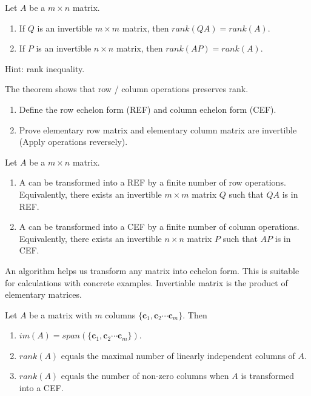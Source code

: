 \documentclass[12pt]{article}
\begin{document}
\begin{theorem}
    Let $A$ be a $m\times n$ matrix.
    \begin{enumerate}
        \item If $Q$ is an invertible $m\times m$ matrix, then $rank(QA)=rank(A)$.
        \item If $P$ is an invertible $n\times n$ matrix, then $rank(AP)=rank(A)$.
    \end{enumerate}
\end{theorem}

\begin{pfbox}
    Hint: rank inequality.
\end{pfbox}

The theorem shows that row / column operations preserves rank.

\begin{exercise}
    \begin{enumerate}
        \item Define the row echelon form (REF) and column echelon form (CEF).
        \item Prove elementary row matrix and elementary column matrix are invertible (Apply operations reversely).
    \end{enumerate}
\end{exercise}

\begin{theorem}
    Let $A$ be a $m\times n$ matrix.
    \begin{enumerate}
        \item A can be transformed into a REF by a finite number of row operations. Equivalently, there exists an invertible $m\times m$ matrix $Q$ such that $QA$ is in REF.
        \item A can be transformed into a CEF by a finite number of column operations. Equivalently, there exists an invertible $n\times n$ matrix $P$ such that $AP$ is in CEF.
    \end{enumerate}
\end{theorem}

\begin{pfbox}
    An algorithm helps us transform any matrix into echelon form. This is suitable for calculations with concrete examples.
    Invertiable matrix is the product of elementary matrices.
\end{pfbox}

\begin{theorem}
    Let $A$ be a matrix with $m$ columns $\{\mathbf{c}_1, \mathbf{c}_2\cdots\mathbf{c}_m\}$.
    Then 
    \begin{enumerate}
        \item $im(A)=span(\{\mathbf{c}_1, \mathbf{c}_2\cdots\mathbf{c}_m\})$.
        \item $rank(A)$ equals the maximal number of linearly independent columns of $A$.
        \item $rank(A)$ equals the number of non-zero columns when $A$ is transformed into a CEF.
    \end{enumerate} 
\end{theorem}
\end{document}
